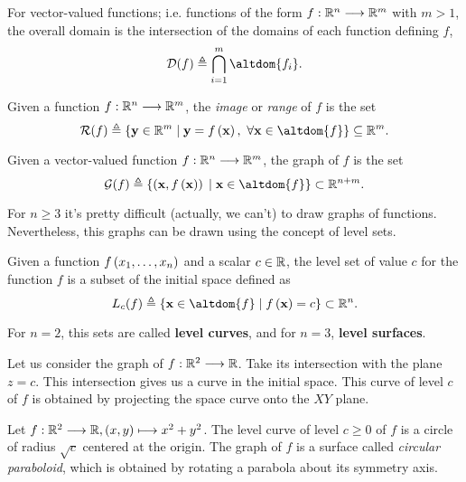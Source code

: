 \noindent For vector-valued functions; i.e. functions of the form $\stdvf$ with $m > 1$, the overall domain is the intersection of the
domains of each function defining $f$,
\begin{equation}
\dom{f}\bydef\bigcap_{i=1}^m\altdom{f_i}.
\end{equation}

\begin{defn}[Image]
Given a function $\stdvf$, the \textit{image} or \textit{range} of $f$ is the set
\begin{equation}
\image{f}\bydef\{\vec{y}\in\R^m\st \vec{y} = f\left(\vec{x}\right),\ \forall\vec{x}\in\altdom{f}\}\subseteq\R^m.
\end{equation}
\end{defn}

\begin{defn}[Graph]
Given a vector-valued function $\stdvf$, the graph of $f$ is the set
\begin{equation}
\fgraph{f}\bydef\{\left(\vec{x}, f\left(\vec{x}\right)\right)\st\vec{x}\in\altdom{f}\}\subset\R^{n + m}.
\end{equation}
\end{defn}

For $n\geq 3$ it's pretty difficult (actually, we can't) to draw graphs of functions. Nevertheless, this graphs
can be drawn using the concept of level sets.

\begin{defn}
Given a function $f\left(x_1, \ldots, x_n\right)$ and a scalar $c\in\R$, the level set of value $c$ for the function $f$ is a subset of the initial space
defined as
\begin{equation}
\levelset{c}{f} \bydef \{\vec{x}\in\altdom{f}\st f\left(\vec{x}\right) = c\}\subset\Rtn.
\end{equation}
\end{defn}

\begin{note}
    For $n=2$, this sets are called \textbf{level curves}, and for $n=3$, \textbf{level surfaces}.
\end{note}

Let us consider the graph of $\appl{f}{\R^2}{\R}$. Take its intersection with the plane $z = c$. This intersection gives 
us a curve in the initial space. This curve of level $c$ of $f$ is obtained by projecting the space curve onto the $XY$
plane.

\begin{example}
    Let $\appl{f}{\R^2}{\R}, (x, y)\longmapsto x^2 + y^2$. The level curve of level $c\geq 0$ of $f$ is a circle of radius
    $\sqrt{c}$ centered at the origin. The graph of $f$ is a surface called \textit{circular paraboloid}, which is obtained
    by rotating a parabola about its symmetry axis.
\end{example}

